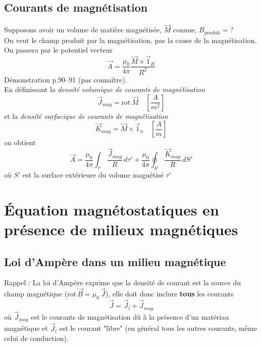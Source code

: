 \documentclass	[11pt, a4paper, openany]{book}
\newcommand{\rot}{\text{rot}\,}
\begin{document}
	\subsection{Courants de magnétisation}
	Supposons avoir un volume de matière magnétisée, $\vec M$ connue, $B_{\text{produit}}=?$\\
	On veut le champ produit par la magnétisation, pas la cause de la magnétisation. On passera par le potentiel vecteur \begin{equation}
	\vec A=\frac{\mu_0}{4\pi}\frac{\vec M\times \vec 1_R}{R^2}
	\end{equation}
	Démonstration p.90--91 (pas connaître).\\
	En définissant la \textit{densité volumique de courants de magnétisation} \begin{equation}
	\vec J_{mag}=\rot\vec M\quad\left[\frac{A}{m^2}\right]
	\end{equation}
	et la \textit{densité surfacique de courants de magnétisation}
	\begin{equation}
		\vec K_{mag}=\vec M\times\vec 1_n\quad\left[\frac{A}{m}\right]
	\end{equation}
	on obtient
	\begin{equation}
		\vec A=\frac{\mu_0}{4\pi}\int_{\tau'}\frac{\vec J_{mag}}{R}\,d\tau'+\frac{\mu_0}{4\pi}\oint_{S'}\frac{\vec K_{mag}}{R}\,dS'
	\end{equation}
	où $S'$ est la surface extérieure du volume magnétisé $\tau'$
	\section{Équation magnétostatiques en présence de milieux magnétiques}
	\subsection{Loi d'Ampère dans un milieu magnétique}
	Rappel : La loi d'Ampère exprime que la densité de courant est la source du champ magnétique ($\rot\vec B=\mu_0\,\vec J$), elle doit donc inclure \textbf{tous} les courants
	\begin{equation}
		\vec J=\vec J_{l}+\vec J_{mag}
	\end{equation}
	où $\vec J_{mag}$ est le courants de magnétisation dû à la présence d'un matériau magnétique et $\vec J_{l}$ est le courant "libre" (en général tous les autres courants, même celui de conduction).\\
	
\end{document}
